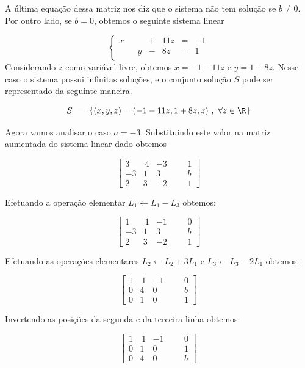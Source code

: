 \begin{solution}
A última equação dessa matriz nos diz que o sistema não tem solução se $b \neq 0$.
Por outro lado, se $b=0$, obtemos o seguinte sistema linear

$$\left\{\begin{array}{rrrrrrr}
 x &   &    & + & 11z & = & -1 \\
   &   &  y & - &  8z & = &  1 \\  \end{array} \right.$$\noindent 
Considerando $z$ como variável livre, obtemos $x=-1-11z$ e $y=1+8z$. Nesse caso o sistema possui infinitas soluções, e o conjunto solução $S$ pode ser representado da seguinte maneira.

$$S\ =\ \left\{ (x,y,z) = (-1-11z, 1+8z , z)\ ,\ \forall z \in \R \right\} $$

\bigskip
Agora vamos analisar o caso $a=-3$. Substituindo este valor na matriz aumentada do sistema linear dado obtemos

$$ \left[\begin{array}{rrrr|rr}
  3 & \ 4 &   -3 & & &   1  \\
 -3 &   1 &    3 & & &   b  \\ 
  2 &   3 &   -2 & & &   1  \end{array}\right] $$

Efetuando a operação elementar $L_1 \leftarrow L_1 - L_3$ obtemos:

$$ \left[\begin{array}{rrrr|rr}
  1 & \ 1 &   -1 & & &   0  \\
 -3 &   1 &    3 & & &   b  \\ 
  2 &   3 &   -2 & & &   1  \end{array}\right] $$

Efetuando as operações elementares $L_2 \leftarrow L_2 + 3L_1$  e   $L_3 \leftarrow L_3 - 2L_1$ obtemos:

$$ \left[\begin{array}{rrrr|rr}
  1 & \ 1 &   -1 & & &   0  \\
  0 &   4 &    0 & & &   b  \\ 
  0 &   1 &    0 & & &   1  \end{array}\right] $$

Invertendo as posições da segunda e da terceira linha obtemos:

$$ \left[\begin{array}{rrrr|rr}
  1 & \ 1 &   -1 & & &   0  \\
  0 &   1 &    0 & & &   1  \\ 
  0 &   4 &    0 & & &   b  \end{array}\right] $$


\end{solution}
